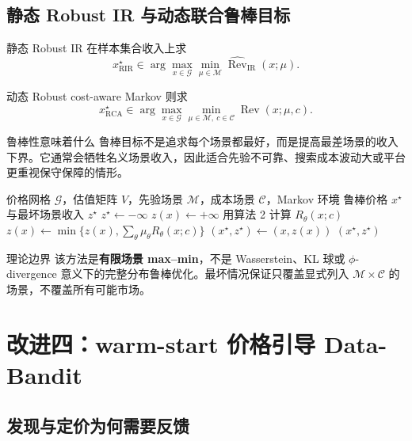 \documentclass[11pt,a4paper]{ctexart}
\newcommand{\Types}{\Theta}
\newcommand{\Priors}{\mathcal M}
\newcommand{\Costs}{\mathcal C}
\newcommand{\Grid}{\mathcal G}
\newcommand{\Rev}{\operatorname{Rev}}
\begin{document}
\subsection{静态 Robust IR 与动态联合鲁棒目标}

静态 Robust IR 在样本集合收入上求
\[
x_{\mathrm{RIR}}^\star
\in\arg\max_{x\in\Grid}
\min_{\mu\in\Priors}
\widehat{\Rev}_{\mathrm{IR}}(x;\mu).
\]

动态 Robust cost-aware Markov 则求
\[
x_{\mathrm{RCA}}^\star
\in\arg\max_{x\in\Grid}
\min_{\mu\in\Priors,\ c\in\Costs}
\Rev(x;\mu,c).
\]

\begin{conceptbox}{鲁棒性意味着什么}
鲁棒目标不是追求每个场景都最好，而是提高最差场景的收入下界。它通常会牺牲名义场景收入，因此适合先验不可靠、搜索成本波动大或平台更重视保守保障的情形。
\end{conceptbox}

\begin{algorithm}[H]
\caption{有限场景鲁棒成本感知定价}
\begin{algorithmic}[1]
\Require 价格网格 $\Grid$，估值矩阵 $V$，先验场景 $\Priors$，成本场景 $\Costs$，Markov 环境
\Ensure 鲁棒价格 $x^\star$ 与最坏场景收入 $z^\star$
\State $z^\star\gets-\infty$
\ForAll{$x\in\Grid$}
  \State $z(x)\gets+\infty$
  \ForAll{$c\in\Costs$}
    \ForAll{$\theta\in\Types$}
      \State 用算法 2 计算 $R_\theta(x;c)$
    \EndFor
    \ForAll{$\mu\in\Priors$}
      \State $z(x)\gets\min\{z(x),\sum_\theta\mu_\theta R_\theta(x;c)\}$
    \EndFor
  \EndFor
    \State $(x^\star,z^\star)\gets(x,z(x))$
  \EndIf
\EndFor
\State \Return $(x^\star,z^\star)$
\end{algorithmic}
\end{algorithm}

\begin{boundarybox}{理论边界}
该方法是\textbf{有限场景 max--min}，不是 Wasserstein、KL 球或 $\phi$-divergence 意义下的完整分布鲁棒优化。最坏情况保证只覆盖显式列入 $\Priors\times\Costs$ 的场景，不覆盖所有可能市场。
\end{boundarybox}

\section{改进四：warm-start 价格引导 Data-Bandit}

\subsection{发现与定价为何需要反馈}
\end{document}
